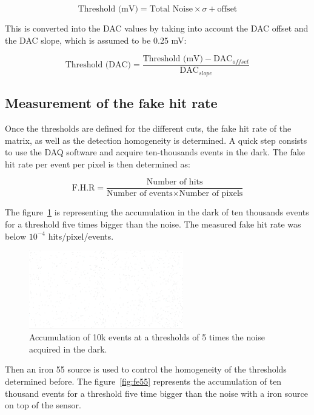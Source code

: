  \begin{equation}
    \text{Threshold (mV)} = \text{Total Noise} \times \sigma + \text{offset}
  \end{equation}

  This is converted into the DAC values by taking into account the DAC offset and the DAC slope, which is assumed to be 0.25 mV:
  
  \begin{equation}
    \text{Threshold (DAC)} = \frac{\text{Threshold (mV)} - \text{DAC}_{offset}}{\text{DAC}_{slope}}
  \end{equation}

  \subsection{Measurement of the fake hit rate}

  Once the thresholds are defined for the different cuts, the fake hit rate of the matrix, as well as the detection homogeneity is determined.
  A quick step consists to use the DAQ software and acquire ten-thousands events in the dark. 
  The fake hit rate per event per pixel is then determined as:

  \begin{equation}
    \text{F.H.R} = \frac{\text{Number of hits}}{\text{Number of events} \times \text{Number of pixels}} 
  \end{equation}
  
  The figure~\ref{fig:darkEvents} is representing the accumulation in the dark of ten thousands events for a threshold five times bigger than the noise.
  The measured fake hit rate was below $10^{-4}$ hits/pixel/events.

   \begin{figure}[!h]
    \centering
    \includegraphics[width=0.6\textwidth]{Pictures/labTests/8sigma_10kEvents_noSource}
    \caption{Accumulation of 10k events at a thresholds of 5 times the noise acquired in the dark.}
    \label{fig:darkEvents}
  \end{figure}

  Then an iron 55 source is used to control the homogeneity of the thresholds determined before.
  The figure~\ref{fig:fe55} represents the accumulation of ten thousand events for a threshold five time bigger than the noise with a iron source on top of the sensor.
  
